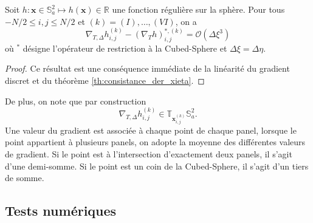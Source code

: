 \begin{proposition}
Soit $h : \mathbf{x} \in \mathbb{S}_a^2 \mapsto h(\mathbf{x}) \in \mathbb{R}$ une fonction régulière sur la sphère. Pour tous $-N/2 \leq i,j \leq N/2$ et $(k)=(I), \ldots , (VI)$, on a
\begin{equation}
\nabla_{T,\Delta} h_{i,j}^{(k)} - (\nabla_T h)^{*,(k)}_{i,j} = \mathcal{O} \left( \Delta \xi^3 \right)
\end{equation}
où $^*$ désigne l'opérateur de restriction à la Cubed-Sphere et $\Delta \xi = \Delta \eta$. 
\label{prop:accuracy_gradient}
\end{proposition}

\begin{proof}
Ce résultat est une conséquence immédiate de la linéarité du gradient discret et du théorème \ref{th:consistance_der_xieta}.
\end{proof}
De plus, on note que par construction
\begin{equation}
\nabla_{T,\Delta} h_{i,j}^{(k)} \in \mathbb{T}_{\mathbf{x}_{i,j}^{(k)}} \mathbb{S}_a^2.
\end{equation}
Une valeur du gradient est associée à chaque point de chaque panel, lorsque le point appartient à plusieurs panels, on adopte la moyenne des différentes valeurs de gradient. Si le point est à l'intersection d'exactement deux panels, il s'agit d'une demi-somme. Si le point est un coin de la Cubed-Sphere, il s'agit d'un tiers de somme.

\subsection{Tests numériques}

